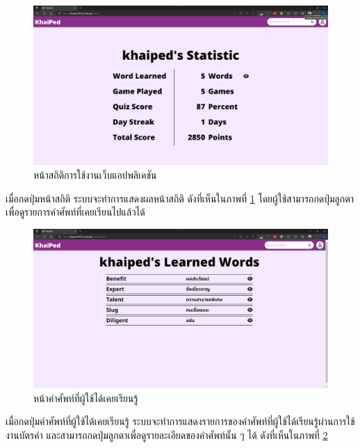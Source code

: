 \documentclass[12pt,oneside,openright,a4paper]{cpe-thai-project}
\begin{document}
\pagebreak
\begin{figure}[!h]\centering
	\includegraphics[width=\textwidth, keepaspectratio=true]{image/chap4/UI/stat/stat.png}
	\caption{{หน้าสถิติการใช้งานเว็บแอปพลิเคชัน}}\label{fig:chap4UIStat}
\end{figure}
\hspace{1cm}
เมื่อกดปุ่มหน้าสถิติ ระบบจะทำการแสดงผลหน้าสถิติ ดังที่เห็นในภาพที่ \ref{fig:chap4UIStat}
โดยผู้ใช้สามารถกดปุ่มลูกตา เพื่อดูรายการคำศัพท์ที่เคยเรียนไปแล้วได้

\begin{figure}[!h]\centering
	\includegraphics[width=\textwidth, keepaspectratio=true]{image/chap4/UI/stat/word learned.png}
	\caption{{หน้าคำศัพท์ที่ผู้ใช้ได้เคยเรียนรู้}}\label{fig:chap4UIStatWord}
\end{figure}
\hspace{1cm}
เมื่อกดปุ่มคำศัพท์ที่ผู้ใช้ได้เคยเรียนรู้ ระบบจะทำการแสดงรายการของคำศัพท์ที่ผู้ใช้ได้เรียนรู้ผ่านการใช้งานบัตรคำ
และสามารถกดปุ่มลูกตาเพื่อดูรายละเอียดของคำศัพท์นั้น ๆ ได้ ดังที่เห็นในภาพที่ \ref{fig:chap4UIStatWord}
\end{document}
